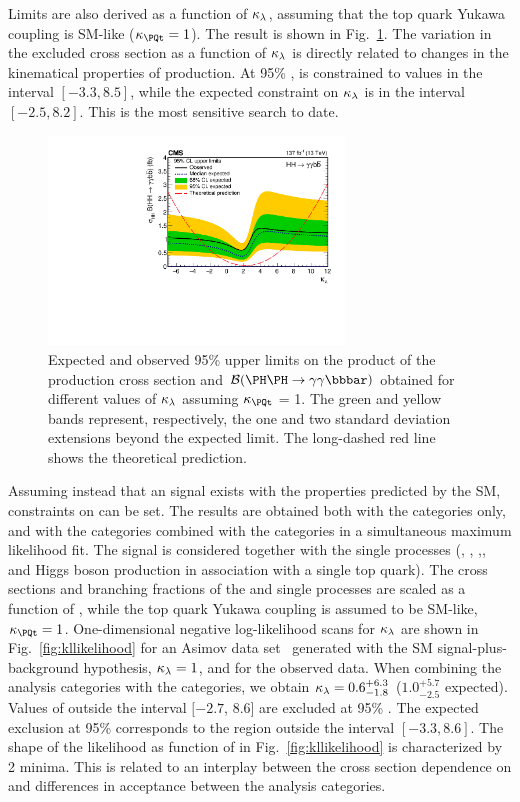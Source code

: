 \documentclass[11pt,twoside,a4paper,cmspaper,final,collab]{cms-tdr}
\begin{document}
Limits are also derived as a function of $\kappa_{\lambda}$, assuming that the top quark Yukawa coupling is SM-like ($\kapt = 1$). The result is shown in Fig.~\ref{fig:klambdascan}. The variation in the excluded cross section as a function of $\kappa_{\lambda}$ is directly related to changes in the kinematical properties of \HH production. At 95\% \CL, \kapl is constrained to values in the interval $[-3.3, 8.5]$, while the expected constraint on $\kappa_{\lambda}$ is in the interval $[-2.5, 8.2]$. This is the most sensitive search to date.

\begin{figure}[!ht]
  \centering
\includegraphics[width=0.7\textwidth]{Figure_010.pdf}\hfil 

  \caption{Expected and observed 95\% \CL upper limits on the product of the \HH production cross section and $\mathcal{B}(\HH\to\bbgg)$ obtained for different values of $\kappa_{\lambda}$ assuming $\kapt$ = 1. The green and yellow bands represent, respectively, the one and two standard deviation extensions beyond the expected limit. The long-dashed red line shows the theoretical prediction.
}
  \label{fig:klambdascan}
\end{figure}


Assuming instead that an \HH signal exists with the properties predicted by the SM, constraints on \lbdHHH can be set. The results are obtained both with the \HH categories only, and with the \HH categories combined with the \ttH categories in a simultaneous maximum likelihood fit. 
The \HH signal is considered together with the single \PH processes (\ttH, \ggH, \VBFH,\VH, and Higgs boson production in association with a single top
quark). The cross sections and branching fractions of the \HH and single \PH processes are scaled as a function of \kapl, while the top quark Yukawa coupling is assumed to be SM-like, $\kapt=1$.
One-dimensional negative log-likelihood scans for $\kappa_{\lambda}$ are shown in Fig.~\ref{fig:kllikelihood} for an Asimov data set~\cite{CLSA} generated with the SM signal-plus-background hypothesis, $\kappa_{\lambda}=1$, and for the observed data.
When combining the \HH analysis categories with the \ttH categories, we obtain $\kappa_{\lambda} = 0.6^{+6.3}_{-1.8}$ ($1.0^{+5.7}_{-2.5}$ expected).
Values of \kapl outside the interval $[-2.7$, $8.6]$ are excluded at 95\% \CL. The expected exclusion at 95\% \CL corresponds to the region outside the interval $[-3.3,8.6]$. The shape of the likelihood as function of \kapl in Fig.~\ref{fig:kllikelihood} is characterized by 2 minima. This is related to an interplay between the cross section dependence on \kapl and differences in acceptance between the analysis categories.
\end{document}
